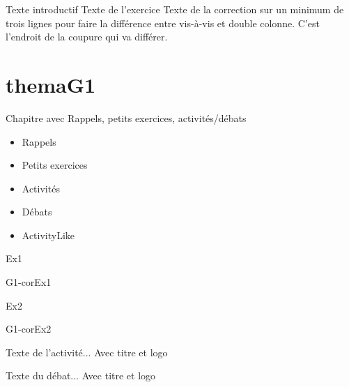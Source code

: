 \documentclass[nocrop]{sesamanuel}
\begin{document}
  \cours  
  \begin{methode}
    Texte introductif
    \exercice
    Texte de l’exercice
    \correction
    Texte de la correction sur un minimum de trois lignes pour faire la
    différence entre vis-à-vis et double colonne. C’est l’endroit de la
    coupure qui va différer.
  \end{methode}


\themaG

\chapter{themaG1}
\begin{prerequis}[Prérequis - G1]
  Chapitre avec Rappels, petits exercices, activités/débats
  \begin{itemize}
  \item Rappels
  \item Petits exercices
  \item Activités
  \item Débats
  \item ActivityLike
  \end{itemize}
\end{prerequis}

\begin{autoeval}  
    \begin{exercice}
      Ex1
    \end{exercice}
    \begin{corrige}
      G1-corEx1
    \end{corrige}
    \begin{exercice}
      Ex2
    \end{exercice}
    \begin{corrige}
      G1-corEx2
    \end{corrige}
\end{autoeval}

\activites
\begin{activite}
  Texte de l’activité... Avec titre et logo
\end{activite}
\begin{debat}
  Texte du débat... Avec titre et logo
\end{debat}
\end{document}
